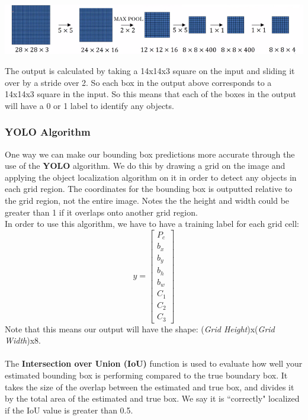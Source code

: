 \documentclass[11pt, a4paper]{article}
\begin{document}
\begin{spacing}{1.1}
	\begin{center}	\includegraphics[scale=.7]{slid_wind_3}	\end{center}
	The output is calculated by taking a 14x14x3 square on the input and sliding it over by a stride over 2. So each box in the output above corresponds to a 14x14x3 square in the input. So this means that each of the boxes in the output will have a 0 or 1 label to identify any objects. \newpage

	\subsubsection{YOLO Algorithm}
	One way we can make our bounding box predictions more accurate through the use of the \textbf{YOLO} algorithm. We do this by drawing a grid on the image and applying the object localization algorithm on it in order to detect any objects in each grid region. The coordinates for the bounding box is outputted relative to the grid region, not the entire image. Notes the the height and width could be greater than 1 if it overlaps onto another grid region. \vspace*{2mm}\\
	In order to use this algorithm, we have to have a training label for each grid cell:
	$$ y = \begin{bmatrix}	P_c \\ b_x \\ b_y \\ b_h \\ b_w \\ C_1 \\ C_2 \\ C_3 \end{bmatrix} $$
	Note that this means our output will have the shape: (\textit{Grid Height})x(\textit{Grid Width})x8. \\~\\
	The \textbf{Intersection over Union (IoU)} function is used to evaluate how well your estimated bounding box is performing compared to the true boundary box. It takes the size of the overlap between the estimated and true box, and divides it by the total area of the estimated and true box. We say it is ``correctly" localized if the IoU value is greater than 0.5. \\~\\

\end{spacing}
\end{document}
